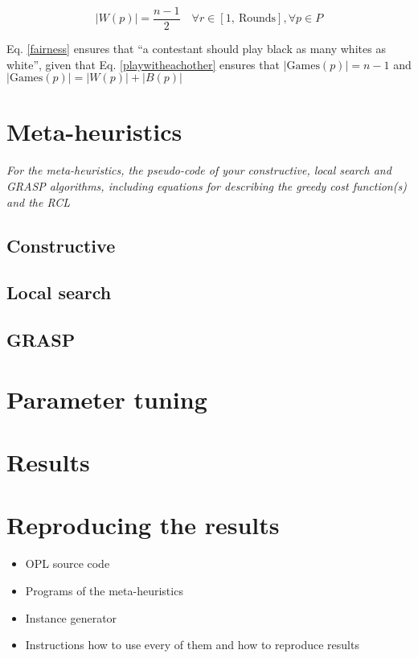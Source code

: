 \documentclass[a4paper, 10pt]{article}
\begin{document}
\begin{equation}
    \label{fairness}
    |W(p)| = \frac{n-1}{2} \quad \forall r \in [1, \ \text{Rounds}], \forall p \in P
\end{equation}

Eq. \ref{fairness} ensures that ``a contestant should play black as many whites as white'', 
given that Eq. \ref{playwitheachother} ensures that $|\text{Games}(p)| = n - 1$ and $|\text{Games}(p)| = |W(p)| + |B(p)|$  


\clearpage

\section{Meta-heuristics}
\textit{For the meta-heuristics, the pseudo-code of your constructive, local search and GRASP algorithms, including equations for describing the greedy cost function(s) and the RCL}

\subsection{Constructive}

\subsection{Local search}

\subsection{GRASP}

\section{Parameter tuning}

\section{Results}

\section{Reproducing the results}

\begin{itemize}
    \item OPL source code
    \item Programs of the meta-heuristics
    \item Instance generator
    \item Instructions how to use every of them and how to reproduce results
\end{itemize}
\end{document}
